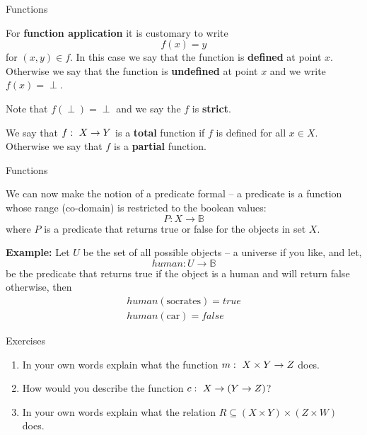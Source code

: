 \documentclass{beamer}
\begin{document}
\begin{frame}{Functions}

For {\bf function application} it is customary to write
\[
f(x) = y
\]
for $(x,y)\in f$.  In this case we say that the function is {\bf defined} at point $x$.
Otherwise we say that the function is {\bf undefined} at point $x$ and we write $f(x)=\perp$.

\vspace{.1in}

Note that $f(\perp) = \perp$  and we say the $f$ is {\bf strict}.
\vspace{.1in}

We say that $f\,\colon\; X \rightarrow Y$ is a {\bf total} function if $f$ is defined for all $x\in X$.
Otherwise we say that $f$ is a {\bf partial} function.
\end{frame}

\begin{frame}{Functions}

We can now make the notion of a predicate formal -- a predicate is a function whose range (co-domain) is restricted to the
boolean values:
\[
P: X \rightarrow {\mathbb B}
\]
where $P$ is a predicate that returns true or false for the objects in set $X$.

\vspace{.1in}

{\bf Example:} Let $U$ be the set of all possible objects -- a universe if you like, and let,
\[
\mathit{human}: U \rightarrow {\mathbb B}
\]
be the predicate that returns true if the object is a human and will return false otherwise, then
\begin{eqnarray*}
\mathit{human}(\mbox{socrates}) = \mathit{true}\\
\mathit{human}(\mbox{car}) = \mathit{false}
\end{eqnarray*}
\end{frame}


\begin{frame}{Exercises}
\begin{enumerate}
\item In your own words explain what the function $m\,\colon\; X\times Y \rightarrow Z$ does.
\item How would you describe the function $c \,\colon\; X \rightarrow (Y \rightarrow Z)$?
\item In your own words explain what the relation $R \subseteq (X\times Y)\times (Z\times W)$ does.
\end{enumerate}
\end{frame}
\end{document}

